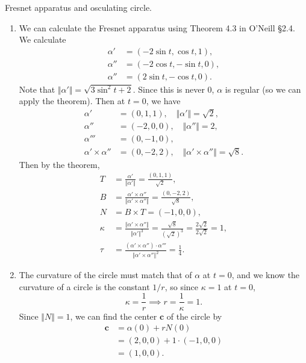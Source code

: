 \documentclass[twoside,10pt]{report}
\begin{document}
\newpage
\begin{exer}[]
Fresnet apparatus and osculating circle.
\end{exer}
\begin{enumerate}
	\item We can calculate the Fresnet apparatus using Theorem 4.3 in O'Neill \S 2.4. We calculate
		\begin{align*}
			\alpha'&=(-2\sin t,\cos t,1),\\
			\alpha''&=(-2\cos t,-\sin t,0),\\
			\alpha''&=(2\sin t,-\cos t,0).
		\end{align*}
		Note that ${\Vert{\alpha'}\Vert}=\sqrt{3 \sin^{2}t+2} $. Since this is never 0, $\alpha$ is regular (so we can apply the theorem). Then at $t=0$, we have
		\begin{align*}
			\alpha'&=(0,1,1), \quad {\Vert{\alpha'}\Vert}=\sqrt{2} ,\\
			\alpha''&=(-2,0,0), \quad {\Vert{\alpha''}\Vert}=2,\\
			\alpha'''&=(0,-1,0),\\
			\alpha'\times \alpha''&= (0,-2,2), \quad {\Vert{\alpha'\times \alpha''}\Vert}=\sqrt{8} .
		\end{align*}
		Then by the theorem,
		\begin{align*}
			T &= \frac{\alpha'}{{\Vert{\alpha'}\Vert}} =\frac{(0,1,1)}{\sqrt{2} } ,\\
			B &= \frac{\alpha' \times \alpha''}{{\Vert{\alpha' \times \alpha''}\Vert}} = \frac{(0,-2,2)}{\sqrt{8} } ,\\
			N &= B\times T = (-1,0,0),\\
			\kappa&= \frac{{\Vert{\alpha' \times \alpha''}\Vert}}{{\Vert{\alpha'}\Vert}^{3}} = \frac{\sqrt{8} }{(\sqrt{2} )^{3}} = \frac{2\sqrt{2} }{2\sqrt{2} }=1,\\
			\tau&=\frac{(\alpha' \times \alpha'')\cdot \alpha'''}{{\Vert{\alpha'\times \alpha''}\Vert}^{2}} = \frac{1}{4} .
		\end{align*}

	\item The curvature of the circle must match that of $\alpha$ at $t=0$, and we know the curvature of a circle is the constant $1/r$, so since $\kappa=1$ at $t=0$,
		\[
		\kappa=\frac{1}{r} \implies r = \frac{1}{\kappa} =1.
		\] 
		Since ${\Vert{N}\Vert}=1$, we can find the center $\mathbf{c}$ of the circle by
		\begin{align*}
			\mathbf{c}&=\alpha(0) + r N(0) \\
				  &= (2,0,0) + 1 \cdot (-1,0,0)\\
				  &= (1,0,0).
		\end{align*}
\end{enumerate}
\end{document}
